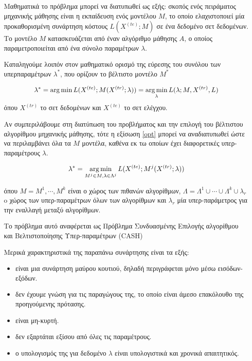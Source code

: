  	Μαθηματικά το πρόβλημα μπορεί να διατυπωθεί ως εξής: σκοπός ενός πειράματος μηχανικής μάθησης είναι η εκπαίδευση ενός μοντέλου $M$, το οποίο ελαχιστοποιεί μία προκαθορισμένη συνάρτηση κόστους $L(X^{(te)};M)$ σε ένα δεδομένο σετ δεδομένων. Το μοντέλο $Μ$ κατασκευάζεται από έναν αλγόριθμο μάθησης $Α$, ο οποίος παραμετροποιείται από ένα σύνολο παραμέτρων $\lambda$.
 	
 	Καταληγούμε λοιπόν στον μαθηματικό ορισμό της εύρεσης του συνόλου των υπερπαραμέτρων $\lambda^*$, που ορίζουν το βέλτιστο μοντέλο $M^*$
 	
 	
 	\begin{equation}
 	\label{opt}
 	\lambda^* = \operatorname*{arg\,min}{L(X^{(te)}; M(X^{(tr)}; \lambda))} = \operatorname*{arg\,min}_{\lambda}{L(\lambda; M, X^{(tr)}, L)}
 	\end{equation} 
 	όπου $X^{(tr)}$ το σετ δεδομένων και $X^{(te)}$ το σετ ελέγχου.
 	
 	Αν συμπεριλάβουμε στη διατύπωση του προβλήματος και την επιλογή του βέλτιστου αλγορίθμου μηχανικής μάθησης, τότε η εξίσωση \ref{opt} μπορεί να αναδιατυπωθεί ώστε να περιλαμβάνει όλα τα $M$ μοντέλα, καθένα εκ τω οποίων έχει διαφορετικές υπερ-παραμέτρους $\lambda$. 
 	
 	\begin{equation}
 	\label{optCash}
 	\lambda^* = \operatorname*{arg\,min}_{M^{j} \in M, \lambda \in \Lambda^{j}}{L(X^{(te)}; M^{j}(X^{(tr)}; \lambda))}
 	\end{equation} 
 	
 	όπου $M ={M^{1}, \cdots, M^{k}}$ είναι ο χώρος των πιθανών αλγορίθμων, $ \Lambda = \Lambda^{1} \cup \cdots \cup \Lambda^{k} \cup {\lambda_r} $ o χώρος των υπερ-παραμέτρων όλων των αλγορίθμων και $\lambda_r$ μία υπερ-παράμετρος για την εναλλαγή μεταξύ αλγορίθμων.
 	
 	Το πρόβλημα αυτό αναφέρεται ως Πρόβλημα Συνδυασμένης Επιλογής αλγορίθμου και Βελτιστοποίησης Υπερ-παραμέτρων (CASH) \citep{DBLP:journals/corr/LoshchilovH16}
 	
	Μερικά χαρακτηριστικά της παραπάνω συνάρτησης είναι τα εξής:
	\begin{itemize}
		\item είναι μια συνάρτηση μαύρου κουτιού, δηλαδή περιγράφεται μόνο μέσω εισόδων-εξόδων.
		\item δεν έχουμε γνώση για τις παραγώγους της, το οποίο είναι άμεσο επακόλουθο της προηγούμενης πρότασης.
		\item είναι μη-κυρτή. 
		\item δεν εξαρτάται εξίσου από όλες τις παραμέτρους. 
		\item ο υπολογισμός της για δεδομένο $\lambda$ είναι υπολογιστικά και χρονικά απαιτητικός.
	\end{itemize}
	
